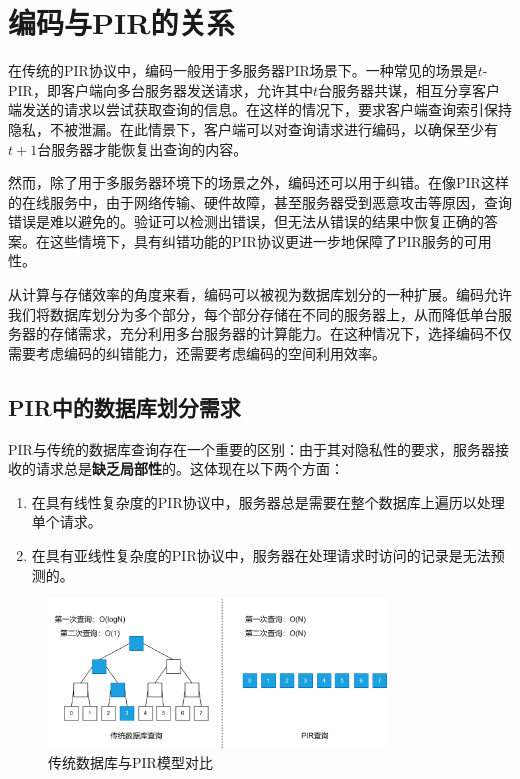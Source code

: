 \section{编码与PIR的关系}
在传统的PIR协议中，编码一般用于多服务器PIR场景下。一种常见的场景是$t$-PIR，即客户端向多台服务器发送请求，允许其中$t$台服务器共谋，相互分享客户端发送的请求以尝试获取查询的信息。在这样的情况下，要求客户端查询索引保持隐私，不被泄漏。在此情景下，客户端可以对查询请求进行编码，以确保至少有$t+1$台服务器才能恢复出查询的内容。

然而，除了用于多服务器环境下的场景之外，编码还可以用于纠错\cite{10.1007/978-3-031-22368-6_3}。在像PIR这样的在线服务中，由于网络传输、硬件故障，甚至服务器受到恶意攻击等原因，查询错误是难以避免的。验证可以检测出错误，但无法从错误的结果中恢复正确的答案。在这些情境下，具有纠错功能的PIR协议更进一步地保障了PIR服务的可用性。

从计算与存储效率的角度来看，编码可以被视为数据库划分的一种扩展。编码允许我们将数据库划分为多个部分，每个部分存储在不同的服务器上，从而降低单台服务器的存储需求，充分利用多台服务器的计算能力。在这种情况下，选择编码不仅需要考虑编码的纠错能力，还需要考虑编码的空间利用效率。

\subsection{PIR中的数据库划分需求}
PIR与传统的数据库查询存在一个重要的区别：由于其对隐私性的要求，服务器接收的请求总是\textbf{缺乏局部性}的。这体现在以下两个方面：
\begin{enumerate}
    \item 在具有线性复杂度的PIR协议中，服务器总是需要在整个数据库上遍历以处理单个请求。
    \item 在具有亚线性复杂度的PIR协议中，服务器在处理请求时访问的记录是无法预测的。
\end{enumerate}

\begin{figure}
    \centering
    \includegraphics[width=0.8\textwidth]{figure/数据库模型.png}
    \caption{传统数据库与PIR模型对比}
    \label{fig:database-model}
\end{figure}

